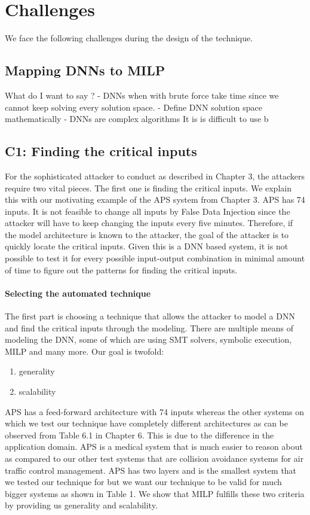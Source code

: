 \chapter{Challenges}
We face  the following challenges during  the design of the technique. 

\section{ Mapping DNNs to MILP}
What do I want to say ?
- DNNs when with brute force take time since we cannot keep solving every solution space. 
- Define DNN solution space mathematically
- 
DNNs are complex algorithms 
It is is difficult to use b


\section{\textbf{C1}: Finding the critical inputs}
For the sophisticated attacker to conduct \attack as described in Chapter 3, the attackers require two vital pieces. The first one is finding the critical inputs. We explain this with our motivating example of the APS system from Chapter 3. APS has 74 inputs. It is not feasible to change all inputs by False Data Injection since the attacker will have to keep changing the inputs every five minutes. Therefore, if the model architecture is known to the attacker, the goal of the attacker is to quickly locate the critical inputs. Given this is a DNN based system, it is not possible to test it for every possible input-output combination in minimal amount of time to figure out the patterns for finding the critical inputs. 

\subsubsection*{Selecting  the automated technique}
The first part is choosing a technique that allows the attacker to model a DNN and find the critical inputs through the modeling. There are multiple means of modeling the DNN, some of which are using SMT solvers, symbolic execution, MILP and many more. 
Our goal is twofold: 
\begin{enumerate}
    \item generality
    \item scalability
\end{enumerate}

APS has a  feed-forward architecture with 74 inputs whereas the other systems on which we test our technique have completely different architectures as can be observed from Table 6.1 in Chapter 6. This is due to the difference in the application domain. APS is a medical system that is much easier to reason about as compared to our other test systems that are collision avoidance systems for air traffic control management.
APS has two layers and is the smallest system that we tested our technique for but we want our technique to be valid for much bigger systems as shown in Table 1. We show that MILP fulfills these two criteria by providing us generality and scalability. 


